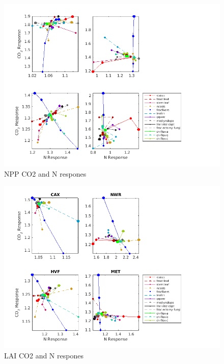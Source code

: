 \documentclass[draft,linenumbers]{agujournal}
\begin{document}
 \begin{figure}[h]
     \includegraphics[width=1.55\textwidth, left]{matlab/figures/OCT_CNdep_NPP1_CLM50defpft_ndep_1x1pt_US-Me2_ens_MIC_p2006.png}
     \caption{NPP CO2 and N respones}
     \label{NPP CO2 and N respones}
  \end{figure}
  
   \begin{figure}[h]
     \centering
     \includegraphics[width=1.55\textwidth, left]{matlab/figures/NOVc_CNdep_TLAI1__p2012.png}
     \caption{LAI CO2 and N respones}
     \label{LAI CO2 and N respones 2001}
  \end{figure}
  
\end{document}

